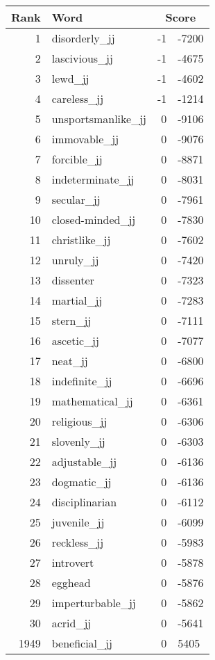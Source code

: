 \begin{longtable}[!htbp]{| rlr@{.}l |}
    \hline
    \textbf{Rank} & \textbf{Word} & \multicolumn{2}{c|}{\textbf{Score}} \\
    \hline
    \endhead
    1 & disorderly\_jj & -1 & -7200 \\
    2 & lascivious\_jj & -1 & -4675 \\
    3 & lewd\_jj & -1 & -4602 \\
    4 & careless\_jj & -1 & -1214 \\
    5 & unsportsmanlike\_jj & 0 & -9106 \\
    6 & immovable\_jj & 0 & -9076 \\
    7 & forcible\_jj & 0 & -8871 \\
    8 & indeterminate\_jj & 0 & -8031 \\
    9 & secular\_jj & 0 & -7961 \\
    10 & closed-minded\_jj & 0 & -7830 \\
    11 & christlike\_jj & 0 & -7602 \\
    12 & unruly\_jj & 0 & -7420 \\
    13 & dissenter & 0 & -7323 \\
    14 & martial\_jj & 0 & -7283 \\
    15 & stern\_jj & 0 & -7111 \\
    16 & ascetic\_jj & 0 & -7077 \\
    17 & neat\_jj & 0 & -6800 \\
    18 & indefinite\_jj & 0 & -6696 \\
    19 & mathematical\_jj & 0 & -6361 \\
    20 & religious\_jj & 0 & -6306 \\
    21 & slovenly\_jj & 0 & -6303 \\
    22 & adjustable\_jj & 0 & -6136 \\
    23 & dogmatic\_jj & 0 & -6136 \\
    24 & disciplinarian & 0 & -6112 \\
    25 & juvenile\_jj & 0 & -6099 \\
    26 & reckless\_jj & 0 & -5983 \\
    27 & introvert & 0 & -5878 \\
    28 & egghead & 0 & -5876 \\
    29 & imperturbable\_jj & 0 & -5862 \\
    30 & acrid\_jj & 0 & -5641 \\
    1949 & beneficial\_jj & 0 & 5405 \\

\end{longtable}
